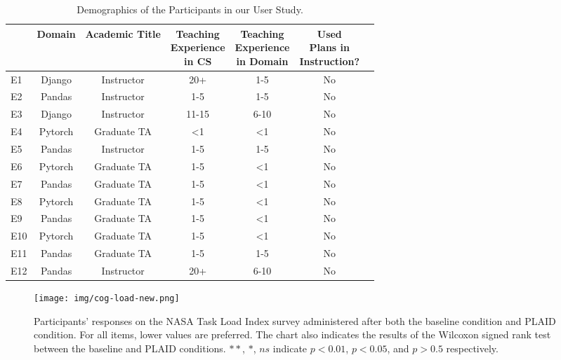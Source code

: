 \begin{table}
\caption{Demographics of the Participants in our User Study.}
    \centering
    \footnotesize
    \label{tab:participants-evaluation}
    \begin{tabular}{l|cccccc}
    \toprule
            & Domain & Academic Title & \shortstack{Teaching \\ Experience \\ in CS} & \shortstack{Teaching \\ Experience \\ in Domain} & \shortstack{Used \\ Plans in \\ Instruction?}
    \\\midrule
        E1 & Django & Instructor & 20+ & 1-5 & No \\
        E2 & Pandas & Instructor & 1-5 & 1-5 & No \\
        E3 & Django & Instructor & 11-15 & 6-10 & No \\
        E4 & Pytorch & Graduate TA & <1 & <1 & No \\
        E5 & Pandas & Instructor & 1-5 & 1-5 & No \\
        E6 & Pytorch & Graduate TA & 1-5 & <1 & No \\
        E7 & Pandas & Graduate TA & 1-5 & <1 & No \\
        E8 & Pytorch & Graduate TA & 1-5 & <1 & No \\
        E9 & Pandas & Graduate TA & 1-5 & <1 & No \\
        E10 & Pytorch & Graduate TA & 1-5 & <1 & No \\
        E11 & Pandas & Graduate TA & 1-5 & 1-5 & No \\
        E12 & Pandas &  Instructor & 20+ & 6-10 & No \\
    \end{tabular}%
\end{table}

\begin{figure}[h]
    \centering
    \texttt{[image: img/cog-load-new.png]}
    \caption{Participants' responses on the NASA Task Load Index survey administered after both the baseline condition and PLAID condition. For all items, lower values are preferred. The chart also indicates the results of the Wilcoxon signed rank test between the baseline and PLAID conditions. $**$, $*$, $ns$ indicate $p < 0.01$, $p < 0.05$, and $p > 0.5$ respectively.}
    \label{fig:cognitive-load}
\end{figure}


